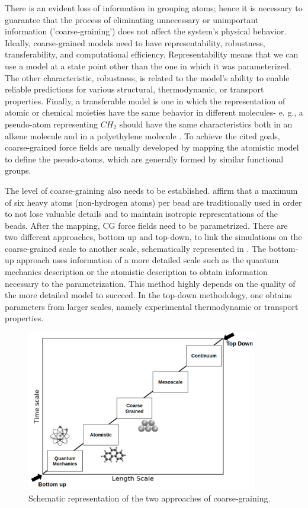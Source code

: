 There is an evident loss of information in grouping atoms; hence it is necessary to guarantee that the process of eliminating unnecessary or unimportant information ('coarse-graining') does not affect the system's physical behavior. Ideally, coarse-grained models need to have representability, robustness, transferability, and computational efficiency. Representability means that we can use a model at a state point other than the one in which it was parameterized. The other characteristic, robustness, is related to the model's ability to enable reliable predictions for various structural, thermodynamic, or transport properties. Finally, a transferable model is one in which the representation of atomic or chemical moieties have the same behavior in different molecules- e. g., a pseudo-atom representing $CH_{2}$ should have the same characteristics both in an alkene molecule and in a polyethylene molecule     \cite{doi:10.1146/annurev-chembioeng-061312-103314}. To achieve the cited goals, coarse-grained force fields are usually developed by mapping the atomistic model to define the pseudo-atoms, which are generally formed by similar functional groups. 

The level of coarse-graining also needs to be established.  affirm that a maximum of six heavy atoms (non-hydrogen atoms) per bead are traditionally used in order to not lose valuable details and to maintain isotropic representations of the beads. After the mapping, CG force fields need to be parametrized. There are two different approaches, bottom up and top-down, to link the simulations on the coarse-grained scale to another scale, schematically represented in . The bottom-up approach uses information of a more detailed scale such as the quantum mechanics description or the atomistic description to obtain information necessary to the parametrization. This method highly depends on the quality of the more detailed model to succeed. In the top-down methodology, one obtains parameters from larger scales, namely experimental thermodynamic or transport properties. 

\begin{figure}[H]
	\raggedleft
	\includegraphics[width=0.9\textwidth]{Figures/multiscale}
	\caption{Schematic representation of the two approaches of coarse-graining.}
	\label{fig:multiscale}
\end{figure}
\FloatBarrier

